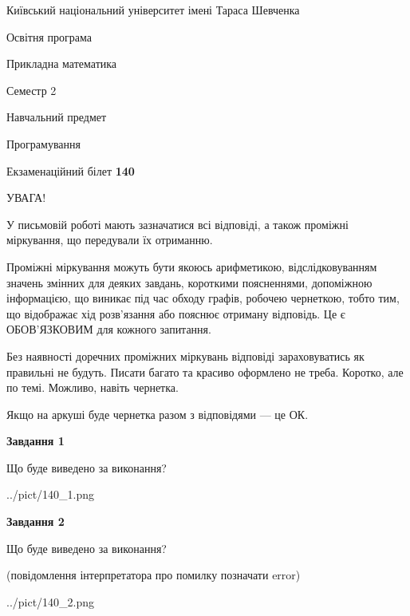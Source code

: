 \documentclass[12pt, ukrainian]{article}
\begin{document}
{{\begin {small}\par
{ \center  Київський національний університет імені Тараса Шевченка \par}
{\parbox {5 cm}{Освітня програма \hfill}{\parbox {7 cm}{Прикладна математика\hfill}}\parbox {6 cm}{\hfill Семестр 2}}\par
{\parbox {5 cm} {Навчальний предмет \hfill}\parbox {7 cm}{Програмування \hfill}\parbox {6cm}{\hfill}\par}\vspace{-7pt} \end{small}}{\center Екзаменаційний білет \No \textbf
{ 140 }\par}}
{
\begin {large}
УВАГА!

У письмовій роботі мають зазначатися всі відповіді, а також проміжні міркування, що передували їх отриманню.

Проміжні міркування можуть бути якоюсь арифметикою, відслідковуванням зна\-чень змінних для деяких завдань,
короткими поясненнями, допоміжною інформацією, що виникає під час обходу графів, робочею чернеткою,
тобто тим, що відображає хід розв’язання або пояснює отриману відповідь.
Це є ОБОВ’ЯЗКОВИМ для кожного запитання.

Без наявності доречних проміжних міркувань відповіді зараховуватись як правиль\-ні не будуть.
Писати багато та красиво оформлено не треба. Коротко, але по темі. Можли\-во, навіть чернетка.

Якщо на аркуші буде чернетка разом з відповідями --- це ОК.

\newpage

{\begin {center}\textbf{Завдання 1}\end {center}}\par
Що буде виведено за виконання?\par
\begin{center}
	{../pict/140_1.png}
\end{center}
\newpage

{\begin {center}\textbf{Завдання 2}\end {center}}\par
Що буде виведено за виконання?\par
 (повідомлення інтерпретатора про помилку позначати error)\par
\begin{center}
	{../pict/140_2.png}
\end{center}
\newpage


\end{large}}
\end{document}

